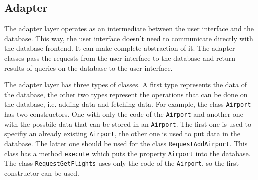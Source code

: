
\subsection{Adapter}
The adapter layer operates as an intermediate between the user interface and the database. This way, the user interface doesn't need to communicate directly with the database frontend. It can make complete abstraction of it. The adapter classes pass the requests from the user interface to the database and return results of queries on the database to the user interface.

The adapter layer has three types of classes. A first type represents the data of the database, the other two types represent the operations that can be done on the database, i.e. adding data and fetching data. For example, the class \texttt{Airport} has two constructors. One with only the code of the \texttt{Airport} and another one with the possbile data that can be stored in an \texttt{Airport}. The first one is used to specifiy an already existing \texttt{Airport}, the other one is used to put data in the database. The latter one should be used for the class \texttt{RequestAddAirport}. This class has a method \texttt{execute} which puts the property \texttt{Airport} into the database. The class \texttt{RequestGetFlights} uses only the code of the \texttt{Airport}, so the first constructor can be used.